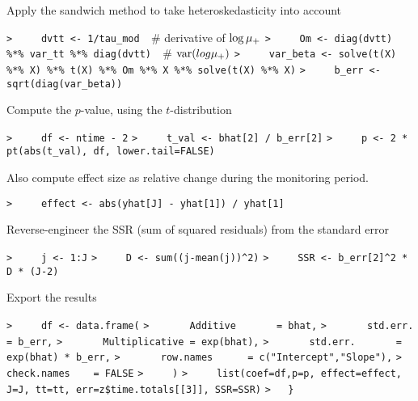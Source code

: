 \documentclass[a4paper]{article}
\begin{document}
Apply the sandwich method to take heteroskedasticity into account\par
\verb~>     dvtt <- 1/tau_mod  ~{\sffamily\# derivative of $\log{{\mu_{+}}}$}\newline
\verb~>     Om <- diag(dvtt) %*% var_tt %*% diag(dvtt)  ~{\sffamily\# $\operatorname{var}(log{{\mu_{+}}})$}\newline
\verb~>     var_beta <- solve(t(X) %*% X) %*% t(X) %*% Om %*% X %*% solve(t(X) %*% X)~\newline
\verb~>     b_err <- sqrt(diag(var_beta))~\par

Compute the $p$-value, using the $t$-distribution\par
\verb~>     df <- ntime - 2~\newline
\verb~>     t_val <- bhat[2] / b_err[2]~\newline
\verb~>     p <- 2 * pt(abs(t_val), df, lower.tail=FALSE)~\par


Also compute effect size as relative change during the monitoring period.\par
\verb~>     effect <- abs(yhat[J] - yhat[1]) / yhat[1]~\par


Reverse-engineer the SSR (sum of squared residuals) from the standard error\par
\verb~>     j <- 1:J~\newline
\verb~>     D <- sum((j-mean(j))^2)~\newline
\verb~>     SSR <- b_err[2]^2 * D * (J-2)~\par

Export the results\par
\verb~>     df <- data.frame(~\newline
\verb~>       Additive       = bhat,~\newline
\verb~>       std.err.       = b_err,~\newline
\verb~>       Multiplicative = exp(bhat),~\newline
\verb~>       std.err.       = exp(bhat) * b_err,~\newline
\verb~>       row.names      = c("Intercept","Slope"),~\newline
\verb~>       check.names    = FALSE~\newline
\verb~>     )~\newline
\verb~>     list(coef=df,p=p, effect=effect, J=J, tt=tt, err=z$time.totals[[3]], SSR=SSR)~\newline
\verb~>   }~\par
\end{document}
